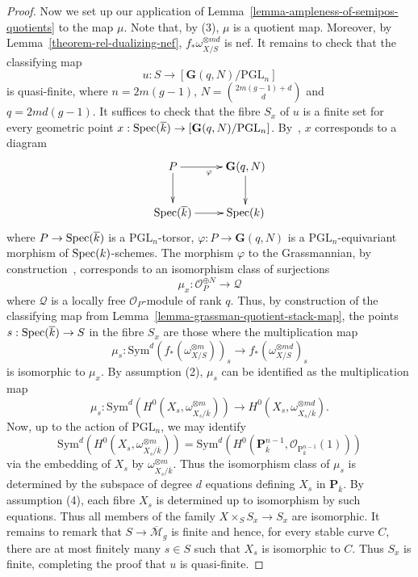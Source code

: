 \begin{proof}
Now we set up our application of Lemma~\ref{lemma-ampleness-of-semipos-quotients}
to the map $\mu$.
Note that, by (3), $\mu$ is a quotient map.
Moreover, by Lemma~\ref{theorem-rel-dualizing-nef},
$f_*\omega_{X/S}^{\otimes md}$ is nef.
It remains to check that the classifying map
$$
u : S \to [\mathbf{G}(q,N)/\mathrm{PGL}_n]
$$
is quasi-finite,
where $n = 2m(g-1)$, $N = \binom{2m(g - 1) + d}{d}$ and $q = 2md(g - 1)$.
It suffices to check that the fibre $S_x$ of $u$ is a finite set for every
geometric point
$x : \mathop{\rm Spec}(\overline k) \to [\mathbf{G}(q,N)/\mathrm{PGL}_n]$.
By~, $x$ corresponds to a diagram
$$
\xymatrix{
  P \ar[d] \ar[r]_\varphi & \mathbf{G}(q,N) \ar[d] \\
  \Spec(\overline k) \ar[r] & \Spec(k)
}
$$
where $P \to \mathop{\rm Spec}(\overline k)$ is a $\mathrm{PGL}_n$-torsor,
$\varphi : P \to \mathbf{G}(q,N)$ is a $\mathrm{PGL}_n$-equivariant morphism of
$\mathop{\rm Spec}(k)$-schemes.
The morphism $\varphi$ to the Grassmannian,
by construction~, corresponds to an isomorphism class of
surjections
$$
\mu_x : \mathcal{O}_P^{\oplus N} \to \mathcal{Q}
$$
where $\mathcal{Q}$ is a locally free $\mathcal{O}_P$-module of rank $q$.
Thus, by construction of the classifying map from
Lemma~\ref{lemma-grassman-quotient-stack-map},
the points $s : \mathop{\rm Spec}(\overline k) \to S$ in the fibre $S_x$ are those
where the multiplication map
$$
\mu_s :
  \mathrm{Sym}^d(f_*(\omega_{X/S}^{\otimes m}))_s \to
  f_*(\omega_{X/S}^{\otimes md})_s
$$
is isomorphic to $\mu_x$.
By assumption (2), $\mu_s$ can be identified as the multiplication map
$$
\mu_s :
  \mathrm{Sym}^d(H^0(X_s,\omega_{X_s/\overline{k}}^{\otimes m})) \to
  H^0(X_s,\omega_{X_s/\overline{k}}^{\otimes md}).
$$
Now, up to the action of $\mathrm{PGL}_n$, we may identify
$$
\mathrm{Sym}^d(H^0(X_s,\omega_{X_s/\overline k}^{\otimes m}))
  = \mathrm{Sym}^d(H^0(\mathbf{P}_{\overline k}^{n - 1},
      \mathcal{O}_{\mathrm{P}^{n-1}_{\overline{k}}}(1)))
$$
via the embedding of $X_s$ by $\omega_{X_s/\overline k}^{\otimes m}$.
Thus the isomorphism class of $\mu_s$ is determined by the subspace of
degree $d$ equations defining $X_s$ in $\mathbf{P}_{\overline k}$.
By assumption (4), each fibre $X_s$ is determined up to isomorphism
by such equations.
Thus all members of the family $X \times_S S_x \to S_x$ are isomorphic.
It remains to remark that $S \to \overline{\mathcal{M}}_g$ is finite and
hence, for every stable curve $C$, there are at most finitely many $s \in S$
such that $X_s$ is isomorphic to $C$.
Thus $S_x$ is finite, completing the proof that $u$ is quasi-finite.
\end{proof}

